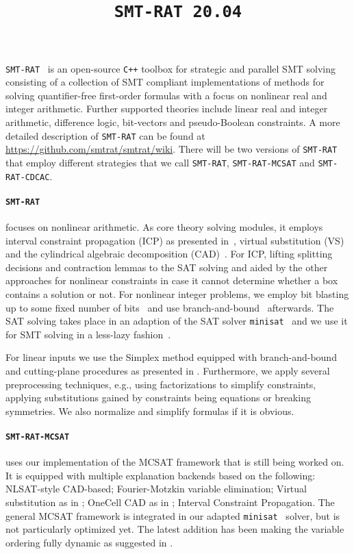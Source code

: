 \documentclass{article}
\title{\texttt{SMT-RAT 20.04}}
\begin{document}
\maketitle

\texttt{SMT-RAT}~\cite{Corzilius2015} is an open-source \texttt{C++} toolbox for strategic and parallel SMT solving
consisting of a collection of SMT compliant implementations of methods for
solving quantifier-free first-order formulas with a focus on nonlinear real and integer arithmetic.
Further supported theories include linear real and integer arithmetic, difference logic, bit-vectors and pseudo-Boolean constraints.
A more detailed description of \texttt{SMT-RAT} can be found at \href{https://github.com/smtrat/smtrat/wiki}{\color{blue}https://github.com/smtrat/smtrat/wiki}.
There will be two versions of \texttt{SMT-RAT} that employ different strategies that we call \texttt{SMT-RAT}, \texttt{SMT-RAT-MCSAT} and \texttt{SMT-RAT-CDCAC}.

\paragraph{\texttt{SMT-RAT}} focuses on nonlinear arithmetic.
As core theory solving modules, it employs interval constraint propagation (ICP) as presented in~\cite{GGIGSC10}, virtual substitution (VS)~\cite{Article_Corzilius_FCT2011} and the cylindrical algebraic decomposition (CAD)~\cite{Loup2013}. For ICP, lifting splitting decisions and contraction lemmas to the SAT solving and aided by the other approaches for nonlinear constraints in case it cannot determine whether a box contains a solution or not. For nonlinear integer problems, we employ bit blasting up to some fixed number of bits~\cite{kruger2015bitvectors} and use branch-and-bound~\cite{Kremer2016} afterwards.
The SAT solving takes place in an adaption of the SAT solver \texttt{minisat}~\cite{Een2003} and we use it for SMT solving in a less-lazy fashion~\cite{sebastiani2007lazy}.

For linear inputs we use the Simplex method equipped with branch-and-bound and cutting-plane procedures as presented in \cite{DM06}.
Furthermore, we apply several preprocessing techniques, e.g., using factorizations to simplify constraints, applying substitutions gained by constraints being equations or breaking symmetries. We also normalize and simplify formulas if it is obvious.

\paragraph{\texttt{SMT-RAT-MCSAT}} uses our implementation of the MCSAT framework \cite{Moura2013} that is still being worked on.
It is equipped with multiple explanation backends based on the following: NLSAT-style CAD-based; Fourier-Motzkin variable elimination; Virtual substitution as in \cite{Abraham2017}; OneCell CAD as in \cite{Neuss2018}; Interval Constraint Propagation.
The general MCSAT framework is integrated in our adapted \texttt{minisat}~\cite{Een2003} solver, but is not particularly optimized yet.
The latest addition has been making the variable ordering fully dynamic as suggested in \cite{Jovanovic2013}.
\end{document}
